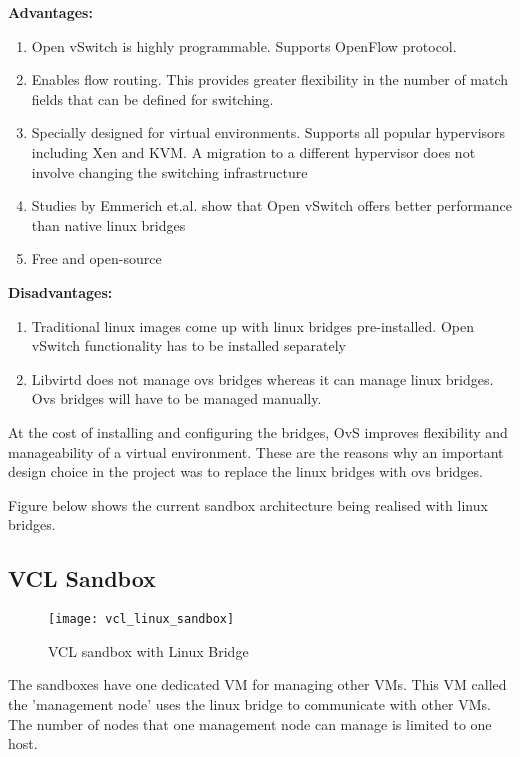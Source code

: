 \documentclass[12pt]{extarticle}
\begin{document}
\noindent
\textbf{Advantages:}
\begin{enumerate}
    \item Open vSwitch is highly programmable. Supports OpenFlow protocol.
    \item Enables flow routing. This provides greater flexibility in the number of match fields that can be defined for switching. 
    \item Specially designed for virtual environments. Supports all popular hypervisors including Xen and KVM. A migration to a different hypervisor does not involve changing the switching infrastructure
    \item Studies by Emmerich et.al. \cite{6968979} show that Open vSwitch offers better performance than native linux bridges
    \item Free and open-source
\end{enumerate}

\noindent
\textbf{Disadvantages:}
\begin{enumerate}
    \item Traditional linux images come up with linux bridges pre-installed. Open vSwitch functionality has to be installed separately
    \item Libvirtd does not manage ovs bridges whereas it can manage linux bridges. Ovs bridges will have to be managed manually.
\end{enumerate}

At the cost of installing and configuring the bridges, OvS improves flexibility and manageability of a virtual environment. These are the reasons why an important design choice in the project was to replace the linux bridges with ovs bridges.

Figure below shows the current sandbox architecture being realised with linux bridges.
\subsection{VCL Sandbox}

\begin{figure}[H]
\centering
\texttt{[image: vcl\_linux\_sandbox]}
\caption{VCL sandbox with Linux Bridge}
\label{fig:vcllinux}
\end{figure}

The sandboxes have one dedicated VM for managing other VMs. This VM called the 'management node' uses the linux bridge to communicate with other VMs.
The number of nodes that one management node can manage is limited to one host.
\end{document}
